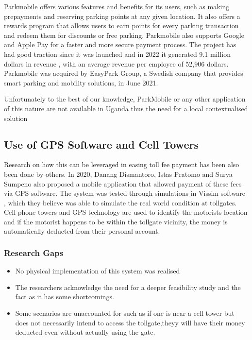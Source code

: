 Parkmobile offers various features and benefits for its users, such as making prepayments and reserving parking points at any given location. It also offers a rewards program that allows users to earn points for every parking transaction and redeem them for discounts or free parking. Parkmobile also supports Google and Apple Pay for a faster and more secure payment process. \cite{ParkMobile2023}
The project has had good traction since it was launched and in 2022 it generated 9.1 million dollars in revenue , with an average revenue per employee of 52,906 dollars. Parkmobile was acquired by EasyPark Group, a Swedish company that provides smart parking and mobility solutions, in June 2021.

Unfortunately to the best of our knowledge, ParkMobile or any other application of this nature are not available in Uganda thus the need for a local contextualised solution

\subsection{Use of GPS Software and Cell Towers}
Research on how this can be leveraged in easing toll fee payment has been also been done by others. In 2020, Danang Dismantoro, Istas Pratomo and Surya Sumpeno also proposed a mobile application that allowed payment of these fees via GPS software\cite{el-rabbany_introduction_2002,dismantoro_minimizing_2020}. The system was tested through simulations in Vissim software \cite{ptv_vissim_traffic_2022}, which they believe was able to simulate the real world condition at tollgates. Cell phone towers and GPS technology are used to identify the motorist\’s location and if the motorist happens to be within the tollgate vicinity, the money is automatically deducted from their personal account.

\subsubsection{Research Gaps}
\begin{itemize}
    \item No physical implementation of this system was realised
    \item The researchers acknowledge the need for a deeper feasibility study and the fact as it has some shortcomings.
    \item Some scenarios are unaccounted for such as if one is near a cell tower but does not necessarily intend to access the tollgate,theyy will have their money deducted even without actually using the gate.
\end{itemize}

